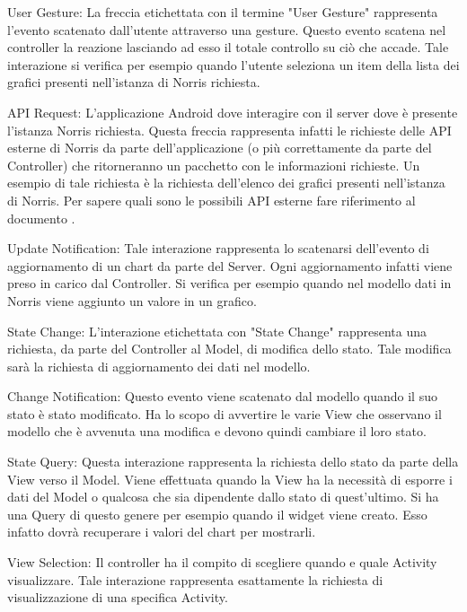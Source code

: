     	\begin{description}
	    	\item{User Gesture:}
	    		La freccia etichettata con il termine "User Gesture" rappresenta l'evento scatenato dall'utente attraverso una gesture. Questo evento scatena nel controller la reazione lasciando ad esso il totale controllo su ciò che accade. Tale interazione si verifica per esempio quando l'utente seleziona un item della lista dei grafici presenti nell'istanza di Norris richiesta.
	    	\item{API Request:}
	    		L'applicazione Android dove interagire con il server dove è presente l'istanza Norris richiesta. Questa freccia rappresenta infatti le richieste delle API esterne di Norris da parte dell'applicazione (o più correttamente da parte del Controller) che ritorneranno un pacchetto con le informazioni richieste. Un esempio di tale richiesta è la richiesta dell'elenco dei grafici presenti nell'istanza di Norris. Per sapere quali sono le possibili API esterne fare riferimento al documento .
	    	\item{Update Notification:}
	    		Tale interazione rappresenta lo scatenarsi dell'evento di aggiornamento di un chart da parte del Server. Ogni aggiornamento infatti viene preso in carico dal Controller. Si verifica per esempio quando nel modello dati in Norris viene aggiunto un valore in un grafico.
	    	\item{State Change:}
	    		L'interazione etichettata con "State Change" rappresenta una richiesta, da parte del Controller al Model, di modifica dello stato. Tale modifica sarà la richiesta di aggiornamento dei dati nel modello.
	    	\item{Change Notification:}
	    		Questo evento viene scatenato dal modello quando il suo stato è stato modificato. Ha lo scopo di avvertire le varie View che osservano il modello che è avvenuta una modifica e devono quindi cambiare il loro stato.
	    	\item{State Query:}
	    		Questa interazione rappresenta la richiesta dello stato da parte della View verso il Model. Viene effettuata quando la View ha la necessità di esporre i dati del Model o qualcosa che sia dipendente dallo stato di quest'ultimo. Si ha una Query di questo genere per esempio quando il widget viene creato. Esso infatto dovrà recuperare i valori del chart per mostrarli.
	    	\item{View Selection:}
	    		Il controller ha il compito di scegliere quando e quale Activity visualizzare. Tale interazione rappresenta esattamente la richiesta di visualizzazione di una specifica Activity.
	    \end{description}

